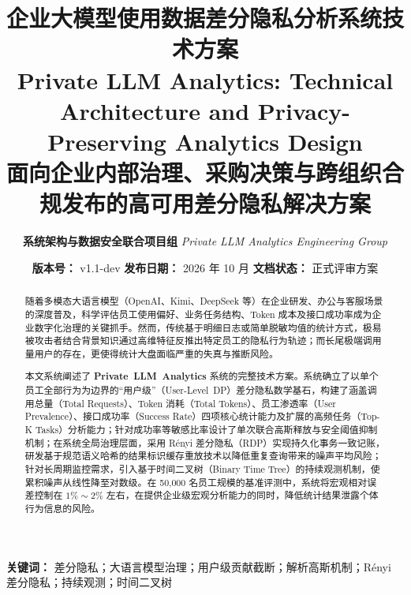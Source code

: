 \documentclass[UTF8,11pt,a4paper]{ctexart}
\title{
  \vspace{-1.2cm}
  {\LARGE\bfseries\color{navyblue} 企业大模型使用数据差分隐私分析系统技术方案}\\[0.25cm]
  {\large\bfseries\color{slateblue} Private LLM Analytics: Technical Architecture and Privacy-Preserving Analytics Design}\\[0.15cm]
  {\normalsize\color{darkgray} 面向企业内部治理、采购决策与跨组织合规发布的高可用差分隐私解决方案}
}
\author{
  \textbf{系统架构与数据安全联合项目组} \quad\textbar\quad \textit{Private LLM Analytics Engineering Group}
}
\date{
  \small \textbf{版本号：} v1.1-dev \quad\textbar\quad \textbf{发布日期：} 2026 年 10 月 \quad\textbar\quad \textbf{文档状态：} 正式评审方案
  \vspace{-0.6cm}
}
\begin{document}
\maketitle
\thispagestyle{empty}

\vspace{0.1cm}
\begin{abstract}
随着多模态大语言模型（OpenAI、Kimi、DeepSeek 等）在企业研发、办公与客服场景的深度普及，科学评估员工使用偏好、业务任务结构、Token 成本及接口成功率成为企业数字化治理的关键抓手。然而，传统基于明细日志或简单脱敏均值的统计方式，极易被攻击者结合背景知识通过高维特征反推出特定员工的隐私行为轨迹；而长尾极端调用量用户的存在，更使得统计大盘面临严重的失真与推断风险。

本文系统阐述了 \textbf{\mbox{Private LLM Analytics}} 系统的完整技术方案。系统确立了以单个员工全部行为为边界的“用户级”（\mbox{User-Level DP}）差分隐私数学基石，构建了涵盖调用总量（Total Requests）、Token 消耗（Total Tokens）、员工渗透率（User Prevalence）、接口成功率（Success Rate）四项核心统计能力及扩展的高频任务（Top-K Tasks）分析能力；针对成功率等敏感比率设计了单次联合高斯释放与安全阈值抑制机制；在系统全局治理层面，采用 Rényi 差分隐私（RDP）实现持久化事务一致记账，研发基于规范语义哈希的结果标识缓存重放技术以降低重复查询带来的噪声平均风险；针对长周期监控需求，引入基于时间二叉树（Binary Time Tree）的持续观测机制，使累积噪声从线性降至对数级。在 50,000 名员工规模的基准评测中，系统将宏观相对误差控制在 $1\% \sim 2\%$ 左右，在提供企业级宏观分析能力的同时，降低统计结果泄露个体行为信息的风险。
\end{abstract}

\vspace{0.2cm}
\begin{center}
\small\textbf{关键词：} 差分隐私；大语言模型治理；用户级贡献截断；解析高斯机制；Rényi 差分隐私；持续观测；时间二叉树
\end{center}

\newpage
{
  \setlength{\parskip}{0pt}
  \linespread{1.05}\selectfont
  \renewcommand{\contentsname}{\vspace*{-0.8cm}\color{navyblue}\Large\bfseries 目\quad 录}
  \setcounter{tocdepth}{2}
  \tableofcontents
  \thispagestyle{empty}
}
\newpage












\newpage
\appendix

\end{document}
